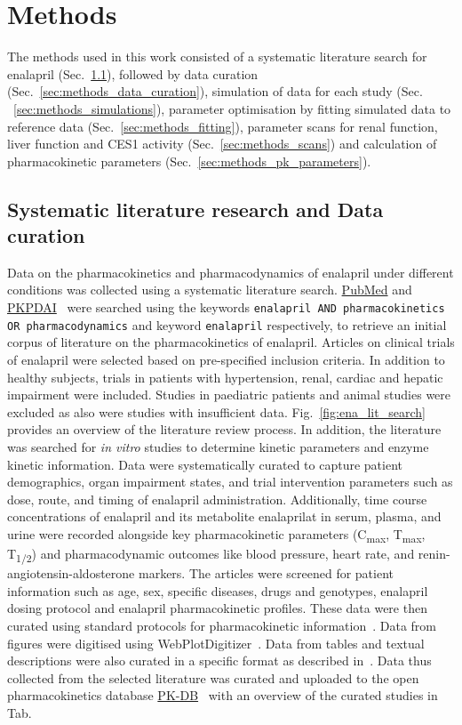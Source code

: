 \section{Methods}\label{sec:methods}\justifying{}
The methods used in this work consisted of a systematic literature search for enalapril (Sec.~\ref{sec:methods_lit_search_data_curate}), followed by data curation (Sec.~\ref{sec:methods_data_curation}), simulation of data for each study (Sec. ~\ref{sec:methods_simulations}), parameter optimisation by fitting simulated data to reference data (Sec.~\ref{sec:methods_fitting}), parameter scans for renal function, liver function and CES1 activity (Sec.~\ref{sec:methods_scans}) and calculation of pharmacokinetic parameters (Sec.~\ref{sec:methods_pk_parameters}).

\subsection{Systematic literature research and Data curation}
\label{sec:methods_lit_search_data_curate} 
Data on the pharmacokinetics and pharmacodynamics of enalapril under different conditions was collected using a systematic literature search. \href{https://pubmed.ncbi.nlm.nih.gov/}{PubMed} and \href{https://www.pkpdai.com/}{PKPDAI}~\cite{GonzalezHernandez2021} were searched using the keywords \texttt{enalapril AND pharmacokinetics OR pharmacodynamics} and keyword \texttt{enalapril} respectively, to retrieve an initial corpus of literature on the pharmacokinetics of enalapril. Articles on clinical trials of enalapril were selected based on pre-specified inclusion criteria. In addition to healthy subjects, trials in patients with hypertension, renal, cardiac and hepatic impairment were included. Studies in paediatric patients and animal studies were excluded as also were studies with insufficient data. Fig.~\ref{fig:ena_lit_search} provides an overview of the literature review process. In addition, the literature was searched for \textit{in vitro} studies to determine kinetic parameters and enzyme kinetic information. Data were systematically curated to capture patient demographics, organ impairment states, and trial intervention parameters such as dose, route, and timing of enalapril administration. Additionally, time course concentrations of enalapril and its metabolite enalaprilat in serum, plasma, and urine were recorded alongside key pharmacokinetic parameters (C\textsubscript{max}, T\textsubscript{max}, T\textsubscript{1/2}) and pharmacodynamic outcomes like blood pressure, heart rate, and renin-angiotensin-aldosterone markers. The articles were screened for patient information such as age, sex, specific diseases, drugs and genotypes, enalapril dosing protocol and enalapril pharmacokinetic profiles. These data were then curated using standard protocols for pharmacokinetic information~\cite{Grzegorzewski2021}. Data from figures were digitised using WebPlotDigitizer~\cite{Rohatgi2024}. Data from tables and textual descriptions were also curated in a specific format as described in~\cite{Grzegorzewski2021}. Data thus collected from the selected literature was curated and uploaded to the open pharmacokinetics database \href{https://alpha.pk-db.com/}{PK-DB}~\cite{Grzegorzewski2021} with an overview of the curated studies in Tab.

